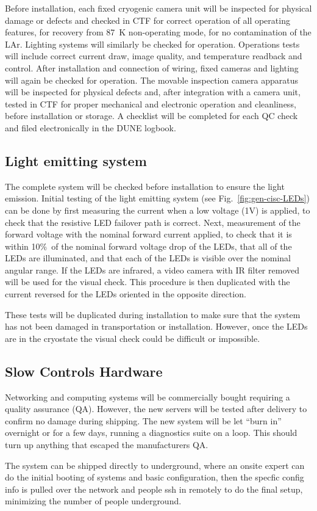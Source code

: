 Before installation, each fixed cryogenic camera unit will be inspected for physical damage or defects and checked in CTF for correct operation of all operating features, for recovery from \SI{87}{K} non-operating mode, for no contamination of the LAr. Lighting systems will similarly be checked for operation. Operations tests will include correct current draw, image quality, and temperature readback and control. After installation and connection of wiring, fixed cameras and lighting will again be checked for operation. The movable inspection camera apparatus will be inspected for physical defects and, after integration with a camera unit, tested in CTF for proper mechanical and electronic operation and cleanliness, before installation or storage. A checklist will be completed for each QC check and filed electronically in the DUNE logbook. 

\subsection{Light emitting system}
\label{sec:fdgen-slow-cryo-qc-les}

The complete system will be checked before installation to ensure the light emission. 
Initial testing of the light emitting system (see Fig.~\ref{fig:gen-cisc-LEDs}) can be done by first
measuring the current when a low voltage (1V) is applied, to check
that the resistive LED failover path is correct. Next, measurement
of the forward voltage with the nominal forward current applied, to
check that it is within 10\%\ of the nominal forward voltage drop of
the LEDs, that all of the LEDs are illuminated, and that each of the
LEDs is visible over the nominal angular range. If the LEDs are
infrared, a video camera with IR filter removed will be used for the
visual check. This procedure is then duplicated with the current
reversed for the LEDs oriented in the opposite direction.  

These tests will be duplicated during
installation to make sure that the system has
not been damaged in transportation or installation. However, once
the LEDs are in the cryostate the visual check could be difficult or impossible.


\subsection{Slow Controls Hardware}
\label{sec:fdgen-slow-cryo-qc-sc-hard}

Networking and computing systems will be commercially bought requiring a quality assurance (QA). However, the new servers will be tested after delivery to confirm no damage during shipping. The new system will be let ``burn in'' overnight or for a few days, running a diagnostics suite on a loop. This should turn up anything that escaped the manufacturers QA.

The system can be shipped directly to underground, where an onsite expert can do the initial booting of systems and basic configuration, then the specfic
config info is pulled over the network and people ssh in remotely to do
the final setup, minimizing the number of people underground.

 
